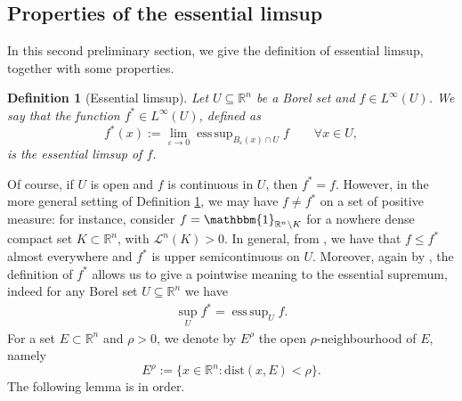 \documentclass[a4paper,11pt]{article}
\numberwithin{equation}{section}
\newtheorem{Definition}[Theorem]{Definition}
\newcommand{\numberset}{\mathbb}
\newcommand{\eps}{\varepsilon}
\newcommand{\R}{\numberset{R}}
\DeclareMathOperator*{\esssup}{ess\,sup}
\theoremstyle{definition}
\begin{document}
\subsection{Properties of the essential limsup}
In this second preliminary section, we give the definition of essential limsup, together with some properties.

\begin{Definition}[Essential limsup]\label{ess limsup}
Let $U\subseteq\R^n$ be a Borel set and $f\in L^\infty(U)$. We say that the function $f^*\in L^\infty(U)$, defined as
$$
f^*(x):=\lim_{\eps\to0}\esssup_{B_\eps(x)\cap U}f\qquad\forall x\in U,
$$
is the essential limsup of $f$.
\end{Definition}
Of course, if $U$ is open and $f$ is continuous in $U$, then $f^*=f$. 
However, in the more general setting of Definition \ref{ess limsup}, we may have $f\neq f^*$ on a set of positive measure: for instance, consider $f=\mathbbm{1}_{\R^n\setminus K}$ for a nowhere dense compact set $K\subset\R^n$, with $\mathscr L^n(K)>0$. In general, from \cite[Proposition 9]{KSIAM}, we have that $f\leq f^*$ almost everywhere and $f^*$ is upper semicontinuous on $U$. Moreover, again by \cite[Proposition 9]{KSIAM}, the definition of $f^*$ allows us to give a pointwise meaning to the essential supremum, indeed for any Borel set $U\subseteq\R^n$ we have
\begin{align}\label{pointwise sup}
\sup_U f^*=\esssup_U f.
\end{align}
For a set $E\subset\R^n$ and $\rho>0$, we denote by $E^\rho$ the open $\rho$-neighbourhood of $E$, namely $$E^\rho:=\{x\in\R^n: \mathrm{dist}(x, E)<\rho\}.$$
The following lemma is in order.
\end{document}
